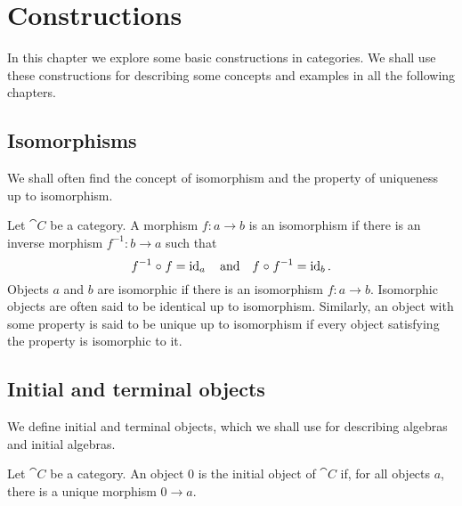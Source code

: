 \chapter{Constructions}
\label{chap:constructions}

In this chapter we explore some basic constructions in categories. We
shall use these constructions for describing some concepts and
examples in all the following chapters.

\section{Isomorphisms}
\label{sec:constructions-isomorphisms}

We shall often find the concept of isomorphism and the property of
uniqueness up to isomorphism.

\begin{definition}
  \label{def:isomorphism}


  Let $\cat{C}$ be a category. A morphism $f: a \to b$ is an
  isomorphism if there is an inverse morphism $f^{-1}: b \to a$ such
  that
  \begin{equation}
    \label{eq:isomorphism}
    f^{-1} \mathrel{\circ} f = \operatorname{id}_{a}
    \quad
    \text{and}
    \quad
    f \mathrel{\circ} f^{-1} = \operatorname{id}_{b}
    \text{.}
  \end{equation}
  Objects $a$ and $b$ are isomorphic if there is an isomorphism $f: a
  \to b$. Isomorphic objects are often said to be identical up to
  isomorphism. Similarly, an object with some property is said to be
  unique up to isomorphism if every object satisfying the property is
  isomorphic to it.

\end{definition}

\section{Initial and terminal objects}
\label{sec:constructions-initial-terminal-objects}

We define initial and terminal objects, which we shall use for
describing algebras and initial algebras.

\begin{definition}
  \label{def:initial-object}


  Let $\cat{C}$ be a category. An object $0$ is the initial object of
  $\cat{C}$ if, for all objects $a$, there is a unique morphism $0 \to
  a$.

\end{definition}

